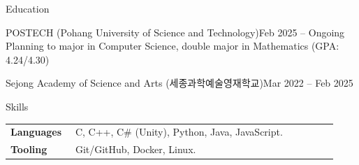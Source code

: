 \documentclass{resume}
\begin{document}

\begin{res-section}{Education}
  \begin{res-subsection}{POSTECH (Pohang University of Science and Technology)}{Feb 2025 -- Ongoing}
    Planning to major in Computer Science, double major in Mathematics (GPA: 4.24/4.30)
  \end{res-subsection}

  \begin{res-subsection}{Sejong Academy of Science and Arts (세종과학예술영재학교)}{Mar 2022 -- Feb 2025}
  \end{res-subsection}
\end{res-section}


\begin{res-section}{Skills}
  \begin{tabular}{p{0.18\linewidth}p{0.75\linewidth}}
    \textbf{Languages}         & C, C++, C\# (Unity), Python, Java, JavaScript. \\
    \textbf{Tooling}           & Git/GitHub, Docker, Linux. \\
  \end{tabular}
\end{res-section}

\end{document}
